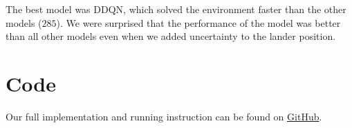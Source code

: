 \documentclass{article}
\begin{document}
	The best model was DDQN, which solved the environment faster than the other models ($ 285 $). We were surprised that the performance of the model was better than all other models even when we added uncertainty to the lander position.
	
	\section{Code}	
	Our full implementation and running instruction can be found on \href{https://github.com/RoeyFuchs/LunarLanderContinuous_RL_project}{GitHub}.
	
	\newpage
	
	
\end{document}
